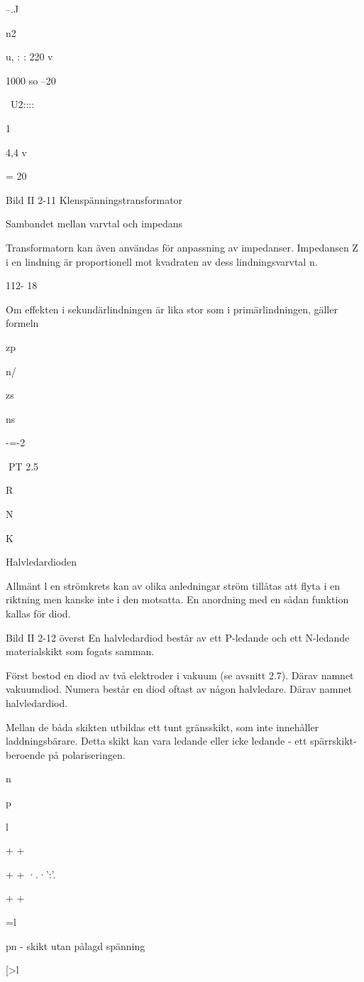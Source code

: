 {--.J

n2

u, : : 220 v

1000
so
--20

~U2::::

1

4,4 v

= 20

Bild II 2-11 Klenspänningstransformator

Sambandet mellan varvtal och impedans

Transformatorn kan även användas för anpassning av impedanser. Impedansen Z i en
lindning är proportionell mot kvadraten av
dess lindningsvarvtal n.

112- 18

Om effekten i sekundärlindningen är lika
stor som i primärlindningen, gäller formeln

zp

n/

zs

ns

-=-2

PT
2.5

R

N

K

Halvledardioden

Allmänt
l en strömkrets kan av olika anledningar
ström tillåtas att flyta i en riktning men kanske inte i den motsatta. En anordning med
en sådan funktion kallas för diod.

Bild II 2-12 överst
En halvledardiod består av ett P-ledande
och ett N-ledande materialskikt som fogats
samman.

Först bestod en diod av två elektroder i
vakuum (se avsnitt 2.7). Därav namnet
vakuumdiod.
Numera består en diod oftast av någon
halvledare. Därav namnet halvledardiod.

Mellan de båda skikten utbildas ett tunt
gränsskikt, som inte innehåller laddningsbärare. Detta skikt kan vara ledande eller
icke ledande - ett spärrskikt- beroende på
polariseringen.

n

p

l

+
+

+
+ ·.·':'.

+
+

=l

pn - skikt utan
pålagd spänning

[>l

}
